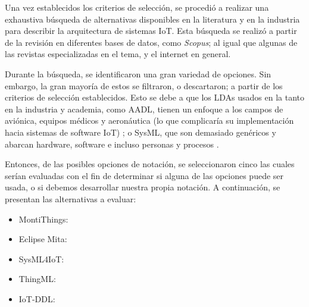 Una vez establecidos los criterios de selección, se procedió a realizar una exhaustiva búsqueda de alternativas disponibles en la literatura y en la industria para describir la arquitectura de sistemas IoT. Esta búsqueda se realizó a partir de la revisión en diferentes bases de datos, como \textit{Scopus}; al igual que algunas de las revistas especializadas en el tema, y el internet en general.

Durante la búsqueda, se identificaron una gran variedad de opciones. Sin embargo, la gran mayoría de estos se filtraron, o descartaron; a partir de los criterios de selección establecidos. Esto se debe a que los LDAs usados en la tanto en la industria y academia, como AADL, tienen un enfoque a los campos de aviónica, equipos médicos y aeronáutica (lo que complicaría su implementación hacia sistemas de software IoT) \cite{aadl_web, aadl_pdf}; o SysML, que son demasiado genéricos y abarcan hardware, software e incluso personas y procesos \cite{omgsysml_2015}.

Entonces, de las posibles opciones de notación, se seleccionaron cinco las cuales serían evaluadas con el fin de determinar si alguna de las opciones puede ser usada, o si debemos desarrollar nuestra propia notación. A continuación, se presentan las alternativas a evaluar:

\begin{itemize}
    \item MontiThings:
    \item Eclipse Mita:
    \item SysML4IoT:
    \item ThingML:
    \item IoT-DDL:
\end{itemize}






